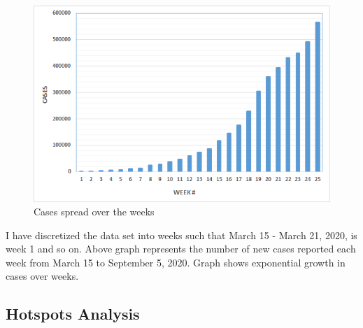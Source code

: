 \documentclass{article}
\begin{document}
\begin{figure}[h]
    \centering
    \includegraphics[scale=0.7]{WeekvsCases}
    \caption{Cases spread over the weeks}
\end{figure}

I have discretized the data set into weeks such that March 15 - March 21, 2020, is week 1 and so on. Above graph represents the number of new cases reported each week from March 15 to September 5, 2020. Graph shows exponential growth in cases over weeks.
\subsection{Hotspots Analysis}
\end{document}
